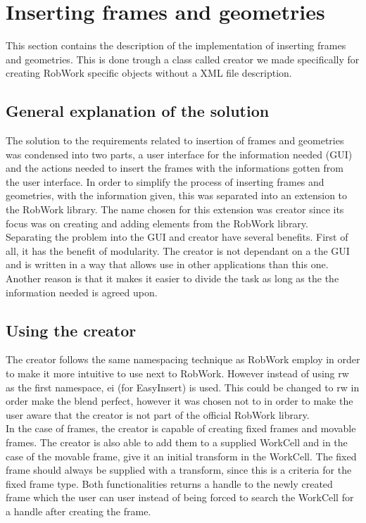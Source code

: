 \section{Inserting frames and geometries}
\label{sec:iframAGeom}
This section contains the description of the implementation of inserting frames and geometries. This is done trough a class called creator we made specifically for creating RobWork specific objects without a XML file description.

\subsection{General explanation of the solution}
\label{subsec:iFramesAGeomsGE}
The solution to the requirements related to insertion of frames and geometries was condensed into two parts, a user interface for the information needed (GUI) and the actions needed to insert the frames with the informations gotten from the user interface. In order to simplify the process of inserting frames and geometries, with the information given, this was separated into an extension to the RobWork library. The name chosen for this extension was creator since its focus was on creating and adding elements from the RobWork library.\\

Separating the problem into the GUI and creator have several benefits. First of all, it has the benefit of modularity. The creator is not dependant on a the GUI and is written in a way that allows use in other applications than this one.\\
Another reason is that it makes it easier to divide the task as long as the the information needed is agreed upon.

\subsection{Using the creator}
\label{subsec:iframAGeomUsing}
The creator follows the same namespacing technique as RobWork employ in order to make it more intuitive to use next to RobWork. However instead of using rw as the first namespace, ei (for EasyInsert) is used. This could be changed to rw in order make the blend perfect, however it was chosen not to in order to make the user aware that the creator is not part of the official RobWork library.\\

In the case of frames, the creator is capable of creating fixed frames and movable frames. The creator is also able to add them to a supplied WorkCell and in the case of the movable frame, give it an initial transform in the WorkCell. The fixed frame should always be supplied with a transform, since this is a criteria for the fixed frame type. 
Both functionalities returns a handle to the newly created frame which the user can user instead of being forced to search the WorkCell for a handle after creating the frame.\\

